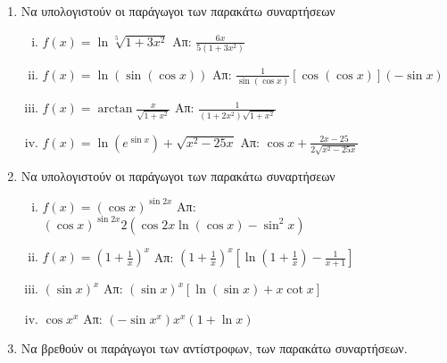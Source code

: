 \begin{enumerate}
  \item Να υπολογιστούν οι παράγωγοι των παρακάτω συναρτήσεων
    \begin{enumerate}[(i)]
      \item $ f(x) = \ln{\sqrt[5]{1+3x^{2}}} $ \hfill Απ: $
        \frac{6x}{5(1+3x^{2})} $
      \item $ f(x) = \ln({\sin({\cos{x}})}) $ \hfill Απ: $
        \frac{1}{\sin{(\cos{x})}} [\cos{(\cos{x})}] (- \sin{x}) $ 
      \item $ f(x) = \arctan \frac{x}{\sqrt{1 + x^{2}}} $ \hfill Απ: $
        \frac{1}{(1+2x^{2})\sqrt{1 + x^{2}}} $
      \item $ f(x) = \ln{(e^{\sin{x}})} + \sqrt{x^{2} - 25x} $ \hfill Απ: $
        \cos{x} + \frac{2x - 25}{2 \sqrt{x^{2} - 25x}}  $  
    \end{enumerate}

  \item  Να υπολογιστούν οι παράγωγοι των παρακάτω συναρτήσεων

    \begin{enumerate}[(i)]
      \item $ f(x) = (\cos{x})^{\sin{2x}} $ \hfill Απ: $
        (\cos{x})^{\sin{2x}} 2(\cos{2x} \ln{(\cos{x})} - \sin^{2}{x}) $
      \item $ f(x) = \left(1 + \frac{1}{x} \right)^{x} $ \hfill Απ: $
        \left(1 + \frac{1}{x}\right)^{x}\left[\ln{(1 + \frac{1}{x})} -
        \frac{1}{x+1}\right] $
      \item $ (\sin{x})^{x} $ \hfill Απ: $ (\sin{x})^{x}[\ln{(\sin{x}
        )} + x \cot{x}] $ 
      \item $ \cos{x}^{x} $ \hfill Απ: $ (- \sin{x^{x}})x^{x} (1 +
        \ln{x}) $
    \end{enumerate}

  \item Να βρεθούν οι παράγωγοι των αντίστροφων, των παρακάτω συναρτήσεων.
    \begin{enumerate}[(i)]
  \end{enumerate}


\end{enumerate}
